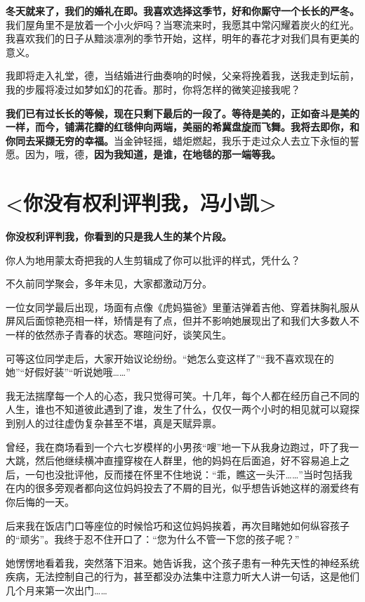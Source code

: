 \documentclass[UTF8,a4paper,8pt]{ctexbook}
\begin{document}
		\textbf{冬天就来了，我们的婚礼在即。我喜欢选择这季节，好和你厮守一个长长的严冬。}我们屋角里不是放着一个小火炉吗？当寒流来时，我愿其中常闪耀着炭火的红光。我喜欢我们的日子从黯淡凛冽的季节开始，这样，明年的春花才对我们具有更美的意义。
		
		我即将走入礼堂，德，当结婚进行曲奏响的时候，父亲将挽着我，送我走到坛前，我的步履将凌过如梦如幻的花香。那时，你将怎样的微笑迎接我呢？
		
		\textbf{我们已有过长长的等候，现在只剩下最后的一段了。等待是美的，正如奋斗是美的一样，而今，铺满花瓣的红毯伸向两端，美丽的希冀盘旋而飞舞。我将去即你，和你同去采撷无穷的幸福。}当金钟轻摇，蜡炬燃起，我乐于走过众人去立下永恒的誓愿。因为，哦，德，\textbf{因为我知道，是谁，在地毯的那一端等我。}

\newpage
\section{<你没有权利评判我，冯小凯>}

		\textbf{你没权利评判我，你看到的只是我人生的某个片段。}
		
		你人为地用蒙太奇把我的人生剪辑成了你可以批评的样式，凭什么？
		
		不久前同学聚会，多年未见，大家都激动万分。
		
		一位女同学最后出现，场面有点像《虎妈猫爸》里董洁弹着吉他、穿着抹胸礼服从屏风后面惊艳亮相一样，矫情是有了点，但并不影响她展现出了和我们大多数人不一样的依然赤子青春的状态。寒暄问好，谈笑风生。
		
		可等这位同学走后，大家开始议论纷纷。“她怎么变这样了”“我不喜欢现在的她”“好假好装”“听说她哦……”
		
		我无法揣摩每一个人的心态，我只觉得可笑。十几年，每个人都在经历自己不同的人生，谁也不知道彼此遇到了谁，发生了什么，仅仅一两个小时的相见就可以窥探到别人的过往虚伪复杂甚至不堪，真是天赋异禀。
		
		曾经，我在商场看到一个六七岁模样的小男孩“嗖”地一下从我身边跑过，吓了我一大跳，然后他继续横冲直撞穿梭在人群里，他的妈妈在后面追，好不容易追上之后，一句也没批评他，反而搂在怀里不住地说：“乖，瞧这一头汗……”当时包括我在内的很多旁观者都向这位妈妈投去了不屑的目光，似乎想告诉她这样的溺爱终有你后悔的一天。
		
		后来我在饭店门口等座位的时候恰巧和这位妈妈挨着，再次目睹她如何纵容孩子的“顽劣”。我终于忍不住开口了：“您为什么不管一下您的孩子呢？”
		
		她愣愣地看着我，突然落下泪来。她告诉我，这个孩子患有一种先天性的神经系统疾病，无法控制自己的行为，甚至都没办法集中注意力听大人讲一句话，这是他们几个月来第一次出门……
		
\end{document}
